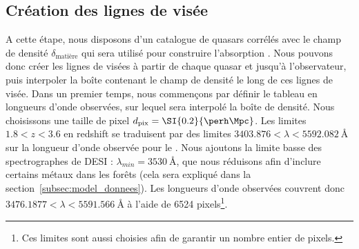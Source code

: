 \subsection{Création des lignes de visée}
\label{subsec:los_interp}
A cette étape, nous disposons d'un catalogue de quasars corrélés avec le champ de densité $\delta_{\mathrm{matière}}$ qui sera utilisé pour construire l'absorption \lya{}. Nous pouvons donc créer les lignes de visées à partir de chaque quasar et jusqu'à l'observateur, puis interpoler la boîte contenant le champ de densité le long de ces lignes de visée.
Dans un premier temps, nous commençons par définir le tableau en longueurs d'onde observées, sur lequel sera interpolé la boîte de densité. Nous choisissons une taille de pixel $d_{\mathrm{pix}} = \SI{0.2}{\perh\Mpc}$. Les limites $\num{1.8} < z < \num{3.6}$ en redshift se traduisent par des limites $\num{3403.876} < \lambda < \SI{5592.082}{\angstrom}$ sur la longueur d'onde observée pour le \lya{}. Nous ajoutons la limite basse des spectrographes de DESI : $\lambda_{min} = \SI{3530}{\angstrom}$, que nous réduisons afin d'inclure certains métaux dans les forêts (cela sera expliqué dans la section~\ref{subsec:model_donnees}). Les longueurs d'onde observées couvrent donc $\num{3476.1877} < \lambda < \SI{5591.566}{\angstrom}$ à l'aide de \num{6524} pixels\footnote{Ces limites sont aussi choisies afin de garantir un nombre entier de pixels.}.

